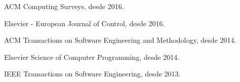\item ACM Computing Surveys, desde 2016.

\item Elsevier - European Journal of Control, desde 2016.

\item ACM Transactions on Software Engineering and Methodology, desde 2014.

\item Elsevier Science of Computer Programming, desde 2014.

\item IEEE Transactions on Software Engineering, desde 2013.

